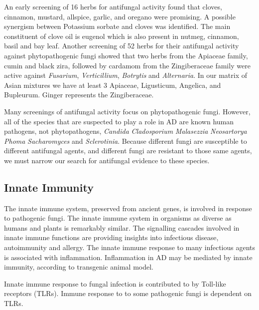 \documentclass[twocolumn]{article}
\begin{document}
%
An early screening of 16 herbs for antifungal activity
found that cloves, cinnamon, mustard, allspice, garlic, and oregano
were promising.
A possible synergism between Potassium sorbate and cloves
was identified.
\cite{azzouz1982comparative}
The main constituent of clove oil is eugenol which
is also present in nutmeg, cinnamon, basil and bay leaf.
\cite{?}
Another screening of 52 herbs for their antifungal activity
against phytopathogenic fungi showed that two herbs from the Apiaceae family,
cumin and black zira, followed by cardamom from the Zingiberaceae family
were active against \textit{Fusarium}, \textit{Verticillium},
\textit{Botrytis} and \textit{Alternaria}.
In our matrix of Asian mixtures we have at least 3 Apiaceae,
Ligusticum,
Angelica,
and Bupleurum.
Ginger represents the Zingiberaceae.


Many screenings of antifungal activity focus on phytopathogenic fungi.
However, all of the species that are suspected to play a role in
AD are known human pathogens, not phytopathogens,
\textit{Candida}
\textit{Cladosporium}
\textit{Malasezzia}
\textit{Neosartorya}
\textit{Phoma}
\textit{Sacharomyces}
and \textit{Sclerotinia}.
Because different fungi are susceptible to different antifungal agents,
and different fungi are resistant to those same agents,
we must narrow our search for antifungal evidence to these species.











\subsection{Innate Immunity}
The innate immune system, preserved from ancient genes,
is involved in response to pathogenic fungi.
\cite{means2009evolutionarily}
The innate immune system in organisms as diverse as humans and plants
is remarkably similar.
\cite{nurnberger2002innate, nurnberger2004innate}
The signalling cascades involved in innate immune functions
are providing insights into infectious disease, autoimmunity and allergy.
The innate immune response to many infectious agents is associated with
inflammation.
\cite{akira2006pathogen}
Inflammation in AD may be mediated by innate immunity,
according to transgenic animal model.
\cite{fassbender2004lps}

Innate immune response to fungal infection is
contributed to by Toll-like receptors (TLRs).
\cite{bellocchio2004contribution}
Immune response to to some pathogenic fungi is dependent
on TLRs.
\cite{
viriyakosol2005innate,
roeder2004toll
}
\end{document}
